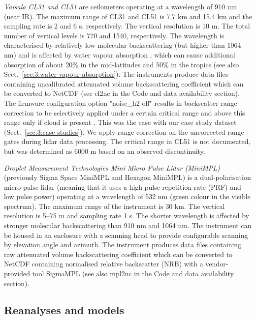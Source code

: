\textit{Vaisala CL31 and CL51} are ceilometers operating at a wavelength of 910
nm (near IR). The maximum range of CL31 and CL51 is 7.7 km and 15.4 km
and the sampling rate is 2 and 6 s, respectively. The vertical resolution
is 10 m. The total number of vertical levels is 770 and 1540, respectively.
The wavelength is characterised by relatively low molecular backscattering
(but higher than 1064 nm) and is affected by water vapour absorption
\citep{wiegner2015,wiegner2019}, which can cause additional absorption of about
20\% in the mid-latitudes and 50\% in the tropics (see also Sect.~\ref{sec:3:water-vapour-absorption}).
The instruments produce
data files containing uncalibrated attenuated volume backscattering coefficient which can be converted
to NetCDF (see cl2nc in the Code and data availability section).
The firmware configuration option "noise\_h2 off" results in backscatter
range correction to be selectively applied under a certain critical range
and above this range only if cloud is present \citep[Sect. 3.2]{kotthaus2016}.
This was the case with our case study dataset (Sect.~\ref{sec:3:case-studies}).
We apply range correction on the uncorrected range gates during lidar
data processing. The critical range in CL51 is not documented, but was
determined as 6000 m based on an observed discontinuity.

\textit{Droplet Measurement Technologies Mini Micro Pulse Lidar (MiniMPL)}
(previously Sigma Space MiniMPL and Hexagon MiniMPL)
\citep{spinhirne1993,campbell2002,flynn2007} is a
dual-polarisation micro pulse lidar (meaning that it uses a high pulse repetition rate (PRF) and low pulse power)
operating at a wavelength of 532 nm (green colour in the visible spectrum). The maximum range of the
instrument is 30 km. The vertical resolution is 5--75 m and sampling rate 1 s. The shorter wavelength is affected
by stronger molecular backscattering than 910 nm and 1064 nm.
The instrument can be housed in an enclosure with a scanning head
to provide configurable scanning by elevation
angle and azimuth. The instrument produces data files containing raw
attenuated volume backscattering coefficient which can be converted to NetCDF containing normalised relative
backscatter (NRB) with a vendor-provided tool SigmaMPL
(see also mpl2nc in the Code and data availability section).

\subsection{Reanalyses and models}
\label{sec:3:reanalyses-and-models}

